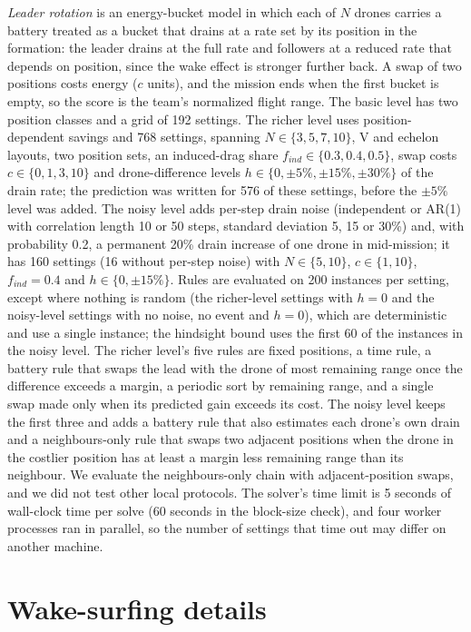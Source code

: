 \documentclass[11pt]{article}
\begin{document}
\emph{Leader rotation} is an energy-bucket model in which each of $N$ drones carries a battery treated as a bucket that drains at a rate set by its position in the formation: the leader drains at the full rate and followers at a reduced rate that depends on position, since the wake effect is stronger further back.
A swap of two positions costs energy ($c$ units), and the mission ends when the first bucket is empty, so the score is the team's normalized flight range.
The basic level has two position classes and a grid of 192 settings.
The richer level uses position-dependent savings and 768 settings, spanning $N \in \{3,5,7,10\}$, V and echelon layouts, two position sets, an induced-drag share $f_{ind} \in \{0.3, 0.4, 0.5\}$, swap costs $c \in \{0,1,3,10\}$ and drone-difference levels $h \in \{0, \pm 5\%, \pm 15\%, \pm 30\%\}$ of the drain rate; the prediction was written for 576 of these settings, before the $\pm 5\%$ level was added.
The noisy level adds per-step drain noise (independent or AR(1) with correlation length 10 or 50 steps, standard deviation 5, 15 or 30\%) and, with probability 0.2, a permanent 20\% drain increase of one drone in mid-mission; it has 160 settings (16 without per-step noise) with $N \in \{5,10\}$, $c \in \{1,10\}$, $f_{ind}=0.4$ and $h \in \{0, \pm 15\%\}$.
Rules are evaluated on 200 instances per setting, except where nothing is random (the richer-level settings with $h=0$ and the noisy-level settings with no noise, no event and $h=0$), which are deterministic and use a single instance; the hindsight bound uses the first 60 of the instances in the noisy level.
The richer level's five rules are fixed positions, a time rule, a battery rule that swaps the lead with the drone of most remaining range once the difference exceeds a margin, a periodic sort by remaining range, and a single swap made only when its predicted gain exceeds its cost. The noisy level keeps the first three and adds a battery rule that also estimates each drone's own drain and a neighbours-only rule that swaps two adjacent positions when the drone in the costlier position has at least a margin less remaining range than its neighbour.
We evaluate the neighbours-only chain with adjacent-position swaps, and we did not test other local protocols.
The solver's time limit is 5 seconds of wall-clock time per solve (60 seconds in the block-size check), and four worker processes ran in parallel, so the number of settings that time out may differ on another machine.

\section{Wake-surfing details}
\label{app:wake}
\end{document}
